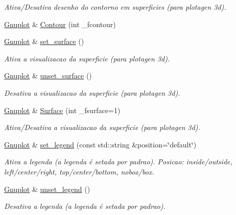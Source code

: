 \begin{DoxyCompactItemize}
\begin{DoxyCompactList}\small\item\em Ativa/\+Desativa desenho do contorno em superficies (para plotagen 3d). \end{DoxyCompactList}\item 
\hyperlink{class_gnuplot}{Gnuplot} \& \hyperlink{class_gnuplot_ab2918e5653c9d421bf924d7dc2467429}{Contour} (int \+\_\+fcontour)
\item 
\hyperlink{class_gnuplot}{Gnuplot} \& \hyperlink{class_gnuplot_a0e36dcd81618234c6cdd135a9e1eee2b}{set\+\_\+surface} ()
\begin{DoxyCompactList}\small\item\em Ativa a visualizacao da superficie (para plotagen 3d). \end{DoxyCompactList}\item 
\hyperlink{class_gnuplot}{Gnuplot} \& \hyperlink{class_gnuplot_a805f1807c9b3a0a6745d66fa1729e3be}{unset\+\_\+surface} ()
\begin{DoxyCompactList}\small\item\em Desativa a visualizacao da superficie (para plotagen 3d). \end{DoxyCompactList}\item 
\hyperlink{class_gnuplot}{Gnuplot} \& \hyperlink{class_gnuplot_a7b338ff4ec6c49659cd2022b68c0e861}{Surface} (int \+\_\+fsurface=1)
\begin{DoxyCompactList}\small\item\em Ativa/\+Desativa a visualizacao da superficie (para plotagen 3d). \end{DoxyCompactList}\item 
\hyperlink{class_gnuplot}{Gnuplot} \& \hyperlink{class_gnuplot_ad64a717dac18167f656c4f09239973f8}{set\+\_\+legend} (const std\+::string \&position=\char`\"{}default\char`\"{})
\begin{DoxyCompactList}\small\item\em Ativa a legenda (a legenda é setada por padrao). Posicao\+: inside/outside, left/center/right, top/center/bottom, nobox/box. \end{DoxyCompactList}\item 
\hyperlink{class_gnuplot}{Gnuplot} \& \hyperlink{class_gnuplot_a584e0710d7f5bcaa35653d1987f1563e}{unset\+\_\+legend} ()
\begin{DoxyCompactList}\small\item\em Desativa a legenda (a legenda é setada por padrao). \end{DoxyCompactList}\item 

\end{DoxyCompactItemize}
